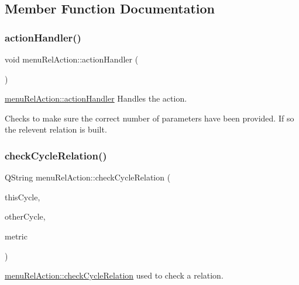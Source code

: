 \subsection{Member Function Documentation}
\mbox{\label{classmenu_rel_action_a23b63e5bdb79e12f74bd1d33a53fb6e0}} 
\subsubsection{\texorpdfstring{action\+Handler()}{actionHandler()}}
{\footnotesize\ttfamily void menu\+Rel\+Action\+::action\+Handler (\begin{DoxyParamCaption}{ }\end{DoxyParamCaption})}



\mbox{\hyperlink{classmenu_rel_action_a23b63e5bdb79e12f74bd1d33a53fb6e0}{menu\+Rel\+Action\+::action\+Handler}} Handles the action. 

Checks to make sure the correct number of parameters have been provided. If so the relevent relation is built. \mbox{\label{classmenu_rel_action_aae6e2ce0d9d17c13d502984dda8a4a54}} 
\subsubsection{\texorpdfstring{check\+Cycle\+Relation()}{checkCycleRelation()}}
{\footnotesize\ttfamily Q\+String menu\+Rel\+Action\+::check\+Cycle\+Relation (\begin{DoxyParamCaption}\item[{const Gi\+Na\+C\+::ex \&}]{this\+Cycle,  }\item[{const Gi\+Na\+C\+::ex \&}]{other\+Cycle,  }\item[{const bool \&}]{metric }\end{DoxyParamCaption})}



\mbox{\hyperlink{classmenu_rel_action_aae6e2ce0d9d17c13d502984dda8a4a54}{menu\+Rel\+Action\+::check\+Cycle\+Relation}} used to check a relation. 


